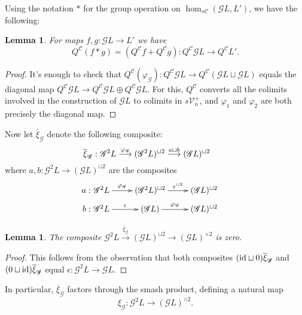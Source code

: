 \documentclass[11pt]{amsart}
\theoremstyle{plain}
\newtheorem{lem}[thm]{Lemma}
\theoremstyle{definition}
\let\phi\varphi
\renewcommand{\to}{\longrightarrow}
\newcommand{\scrQ}{\mathscr{Q}}
\newcommand{\scrR}{\mathscr{R}}
\newcommand{\scrT}{\mathscr{T}}
\newcommand{\scrY}{\mathscr{Y}}
\newcommand{\scrI}{\mathscr{I}}
\newcommand{\scrO}{\mathscr{O}}
\newcommand{\scrP}{\mathscr{P}}
\newcommand{\scrS}{\mathscr{S}}
\newcommand{\scrG}{\mathscr{G}}
\newcommand{\scrH}{\mathscr{H}}
\newcommand{\scrJ}{\mathscr{J}}
\newcommand{\scrK}{\mathscr{K}}
\newcommand{\scrL}{\mathscr{L}}
\newcommand{\scrZ}{\mathscr{Z}}
\newcommand{\scrN}{\mathscr{N}}
\newcommand{\scrM}{\mathscr{M}}
\newcommand{\calC}{\mathcal{C}}
\newcommand{\calV}{\mathcal{V}}
\theoremstyle{plain}
\newcommand{\vect}[2]{\calV^{#1}_{#2}}
\newcommand{\BSW}{{\scrG}}%
\begin{document}
\begin{Composite functor spectral sequences}
Using the notation $*$ for the group operation on $\hom_{s\calC}(\BSW L,L')$, we have the following:
\begin{lem}
For maps $f,g:\BSW L\to L'$ we have 
\[Q^{\calC}(f*g)=(Q^{\calC}f+Q^{\calC}g):Q^{\calC}\BSW L\to Q^{\calC}L'.\]
\end{lem}
\begin{proof}
It's enough to check that $Q^{\calC}(\phi_\BSW ):Q^{\calC}\BSW L\to Q^{\calC}(\BSW L\sqcup \BSW L)$ equals the diagonal map $Q^{\calC}\BSW L\to Q^{\calC}\BSW L\oplus Q^{\calC}\BSW L$. For this, $Q^{\calC}$ converts all the colimits involved in the construction of $\BSW L$ to colimits in $s\vect{+}{n}$, and $\phi_1$ and $\phi_2$ are both precisely the diagonal map.
\end{proof}

Now let $\overline{\xi}_{\BSW }$ denote the following composite:
\[\makebox[0mm][r]{$\overline{\xi}_{\BSW }:\ $}\BSW^2L\overset{\phi_{\BSW }}{\to}(\BSW^2L)^{\sqcup2}\overset{a\sqcup b}{\to}(\BSW L)^{\sqcup2}\]
where $a,b:\BSW^2L\to(\BSW L)^{\sqcup2}$ are the composites
\[\xymatrix@R=2mm{
\makebox[0mm][r]{$a:\ $}\BSW^2L\ar[r]^-{\phi_{\BSW }}
&%
(\BSW^2L)^{\sqcup2}\ar[r]^-{\epsilon^{\sqcup2}}
&%
(\BSW L)^{\sqcup2}\\
\makebox[0mm][r]{$b:\ $}\BSW^2L\ar[r]^-{\epsilon}
&%
(\BSW L)\ar[r]^-{\phi_{\BSW }}
&%
(\BSW L)^{\sqcup2}
}\]
\begin{lem}
The composite 
$\BSW^2L\overset{\overline{\xi}_{\BSW }}{\to}(\BSW L)^{\sqcup2}\to(\BSW L)^{\times2}$ is zero.
\end{lem}
\begin{proof}
This follows from the observation that both composites $(\textup{id}\sqcup0)\overline{\xi}_{\BSW }$ and $(0\sqcup\textup{id})\overline{\xi}_{\BSW }$ equal $\epsilon:\BSW^2L\to \BSW L$.
\end{proof}
In particular, $\overline{\xi}_{\BSW }$ factors through the smash product, defining a natural map
\[\xi_{\BSW }:\BSW^2L\to (\BSW L)^{\wedge 2}.\]


\end{Composite functor spectral sequences}
\end{document}
